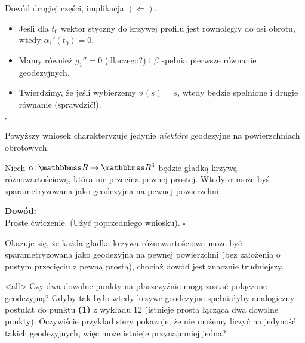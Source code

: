 \begin{frame}

Dowód drugiej części, implikacja $(\Leftarrow)$.
\begin{itemize}
\item Jeśli dla $t_0$ wektor styczny do krzywej profilu jest równoległy do osi obrotu, wtedy $\alpha_1'(t_0)=0$. 
\pause\item Mamy również $g_1''=0$ (dlaczego?) i $\beta$ spełnia pierwsze równanie geodezyjnych.
\pause \item Twierdzimy, że jeśli wybierzemy $\vartheta(s)=s$, wtedy będzie spełnione i drugie równanie (sprawdzić!).
\end{itemize}
\hfill $\square$

\pause \begin{uwaga}
Powyższy wniosek charakteryzuje jedynie \textit{niektóre} geodezyjne na powierzchniach obrotowych.
\end{uwaga}

\end{frame}
\begin{frame}

\begin{wniosek}
Niech $\alpha\colon \R\to \R^3$ będzie gładką krzywą różnowartościową, która nie przecina pewnej prostej. Wtedy $\alpha$ może byś sparametryzowana jako geodezyjna na pewnej powierzchni.
\end{wniosek}

\pause \textcolor{ared}{\textbf{Dowód:}}\\
Proste ćwiczenie. (Użyć poprzedniego wniosku).
\hfill $\square$

\bigskip
\pause Okazuje się, że każda gładka krzywa różnowartościowa może być sparametryzowana jako geodezyjna na pewnej powierzchni (bez założenia o pustym przecięciu z pewną prostą), chociaż dowód jest znacznie trudniejszy.
\end{frame}
\mode<all>{}
Czy dwa dowolne punkty na płaszczyźnie mogą zostać połączone geodezyjną? Gdyby tak było wtedy krzywe geodezyjne spełniałyby analogiczny postulat do punktu \textbf{(1)} z wykładu 12 (istnieje prosta łącząca dwa dowolne punkty). Oczywiście przykład sfery pokazuje, że nie możemy liczyć na jedyność takich geodezyjnych, więc może istnieje przynajmniej jedna?

